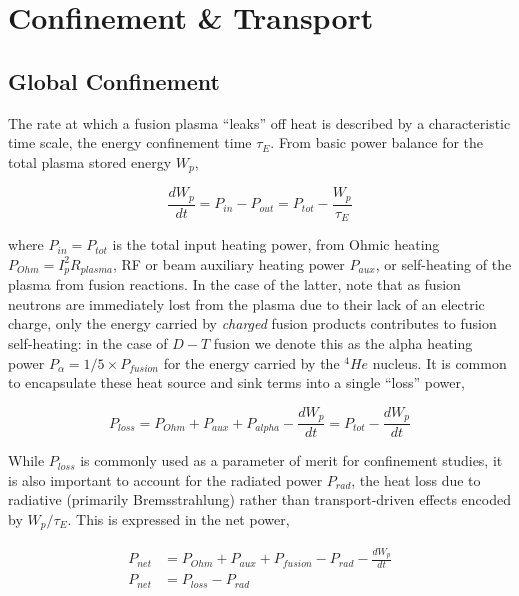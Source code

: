 
\section{Confinement \& Transport}\label{sec:intro_confinement}

\subsection{Global Confinement}\label{subsec:intro_global}

The rate at which a fusion plasma ``leaks'' off heat is described by a characteristic time scale, the energy confinement time $\tau_E$.  From basic power balance for the total plasma stored energy $W_p$,

\begin{equation}\label{eq:powerbalance}
 \frac{dW_p}{dt} = P_{in} - P_{out} = P_{tot} - \frac{W_p}{\tau_E}
\end{equation}

\noindent where $P_{in} = P_{tot}$ is the total input heating power, from Ohmic heating $P_{Ohm} = I_p^2 R_{plasma}$, RF or beam auxiliary heating power $P_{aux}$, or self-heating of the plasma from fusion reactions.  In the case of the latter, note that as fusion neutrons are immediately lost from the plasma due to their lack of an electric charge, only the energy carried by \emph{charged} fusion products contributes to fusion self-heating: in the case of $\si{D} - \si{T}$ fusion we denote this as the alpha heating power $P_{\alpha} = 1/5 \times P_{fusion}$ for the energy carried by the ${}^4\si{He}$ nucleus.  It is common to encapsulate these heat source and sink terms into a single ``loss'' power,

\begin{equation}\label{eq:ploss}
 P_{loss} = P_{Ohm} + P_{aux} + P_{alpha} - \frac{dW_p}{dt} = P_{tot} - \frac{dW_p}{dt}
\end{equation}

\noindent While $P_{loss}$ is commonly used as a parameter of merit for confinement studies, it is also important to account for the radiated power $P_{rad}$, the heat loss due to radiative (primarily Bremsstrahlung) rather than transport-driven effects encoded by $W_p/\tau_E$.  This is expressed in the net power,

\begin{equation}\label{eq:pnet}
 \begin{aligned}
 P_{net} &= P_{Ohm} + P_{aux} + P_{fusion} - P_{rad} - \frac{dW_p}{dt} \\
 P_{net} &= P_{loss} - P_{rad}
 \end{aligned}
\end{equation}

